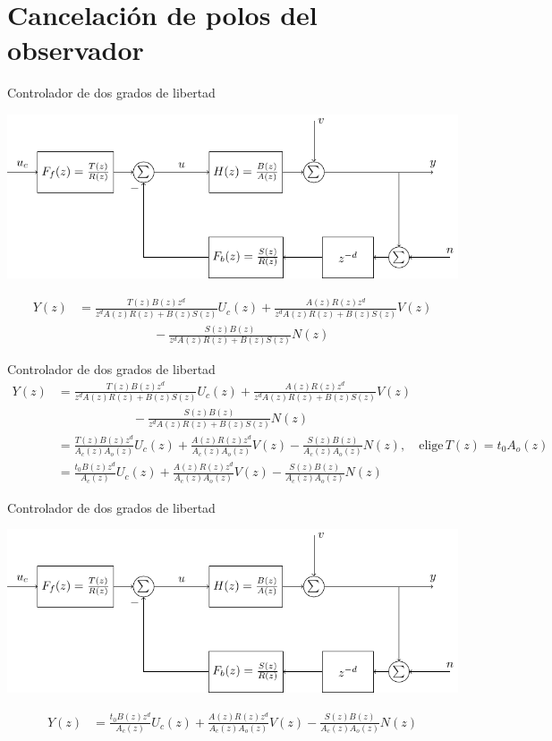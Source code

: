 \documentclass[presentation,aspectratio=169]{beamer}
\begin{document}
\section{Cancelación de polos del observador}
\label{sec:org2fe25ec}
\begin{frame}[label={sec:orgb7ed41e}]{Controlador de dos grados de libertad}
\begin{center}
\includegraphics[width=0.7\linewidth]{../../figures/2dof-block-explicit}
\end{center}

\begin{align*}
Y(z) &= \frac{T(z)B(z)z^d}{z^dA(z)R(z) + B(z)S(z)}U_c(z) + \frac{A(z)R(z)z^d}{z^dA(z)R(z) + B(z)S(z)}V(z)\\ & \qquad\qquad\qquad - \frac{S(z)B(z)}{z^dA(z)R(z) + B(z)S(z)}N(z)
\end{align*}
\end{frame}




\begin{frame}[label={sec:orgaf2fb5e}]{Controlador de dos grados de libertad}
\begin{align*}
Y(z) &= \frac{T(z)B(z)z^d}{z^dA(z)R(z) + B(z)S(z)}U_c(z) + \frac{A(z)R(z)z^d}{z^dA(z)R(z) + B(z)S(z)}V(z)\\ & \qquad\qquad\qquad - \frac{S(z)B(z)}{z^dA(z)R(z) + B(z)S(z)}N(z)\\
     &= \frac{T(z)B(z)z^d}{A_c(z)A_o(z)}U_c(z) + \frac{A(z)R(z)z^d}{A_c(z)A_o(z)}V(z)- \frac{S(z)B(z)}{A_c(z)A_o(z)}N(z), \quad \text{elige}\, T(z) = t_0A_o(z)\\
     &= \frac{t_0B(z)z^d}{A_c(z)}U_c(z) + \frac{A(z)R(z)z^d}{A_c(z)A_o(z)}V(z)- \frac{S(z)B(z)}{A_c(z)A_o(z)}N(z)
\end{align*}
\end{frame}

\begin{frame}[label={sec:org72ddd7f}]{Controlador de dos grados de libertad}
\begin{center}
\includegraphics[width=0.7\linewidth]{../../figures/2dof-block-explicit}
\end{center}
\begin{align*}
Y(z) &= \frac{t_0B(z)z^d}{A_c(z)}U_c(z) + \frac{A(z)R(z)z^d}{A_c(z)A_o(z)}V(z)- \frac{S(z)B(z)}{A_c(z)A_o(z)}N(z)
\end{align*}
\end{frame}
\end{document}
